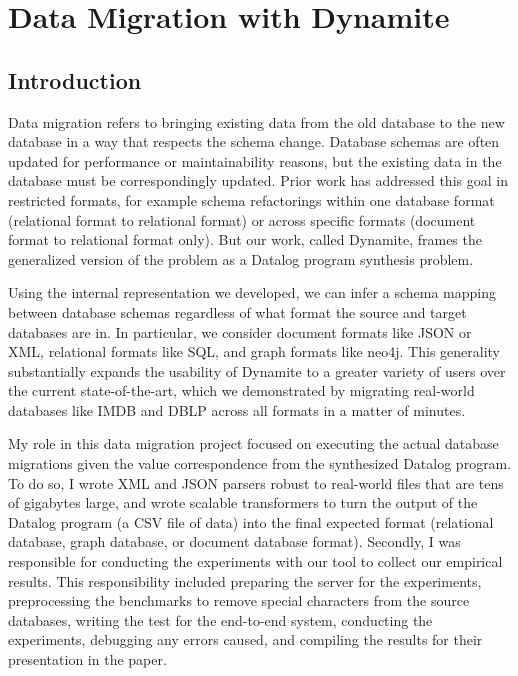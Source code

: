\documentclass[]{article}
\begin{document}


    \section{Data Migration with Dynamite}

        \subsection{Introduction}

            Data migration refers to bringing existing data from the old database to the new database in a way that respects the schema change. Database schemas are often updated for performance or maintainability reasons, but the existing data in the database must be correspondingly updated. Prior work has addressed this goal in restricted formats, for example schema refactorings within one database format (relational format to relational format) or across specific formats (document format to relational format only). But our work, called Dynamite, frames the generalized version of the problem as a Datalog program synthesis problem. 

            Using the internal representation we developed, we can infer a schema mapping between database schemas regardless of what format the source and target databases are in. In particular, we consider document formats like JSON or XML, relational formats like SQL, and graph formats like neo4j. This generality substantially expands the usability of Dynamite to a greater variety of users over the current state-of-the-art, which we demonstrated by migrating real-world databases like IMDB and DBLP across all formats in a matter of minutes.

            My role in this data migration project focused on executing the actual database migrations given the value correspondence from the synthesized Datalog program. To do so, I wrote XML and JSON parsers robust to real-world files that are tens of gigabytes large, and wrote scalable transformers to turn the output of the Datalog program (a CSV file of data) into the final expected format (relational database, graph database, or document database format). Secondly, I was responsible for conducting the experiments with our tool to collect our empirical results. This responsibility included preparing the server for the experiments, preprocessing the benchmarks to remove special characters from the source databases, writing the test for the end-to-end system, conducting the experiments, debugging any errors caused, and compiling the results for their presentation in the paper. 
\end{document}
